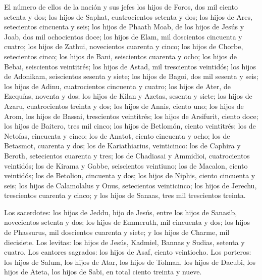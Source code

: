  El número de ellos de la nación y sus jefes los hijos de
Foros, dos mil ciento setenta y dos; los hijos de Saphat, cuatrocientos
setenta y dos;  los hijos de Ares, setecientos cincuenta
y seis;  los hijos de Phaath Moab, de los hijos de Jesús
y Joab, dos mil ochocientos doce;  los hijos de Elam, mil
doscientos cincuenta y cuatro; los hijos de Zathui, novecientos cuarenta
y cinco; los hijos de Chorbe, setecientos cinco; los hijos de Bani,
seiscientos cuarenta y ocho;  los hijos de Bebai,
seiscientos veintitrés; los hijos de Astad, mil trescientos veintidós;
 los hijos de Adonikam, seiscientos sesenta y siete; los
hijos de Bagoi, dos mil sesenta y seis; los hijos de Adinu,
cuatrocientos cincuenta y cuatro;  los hijos de Ater, de
Ezequías, noventa y dos; los hijos de Kilan y Azetas, sesenta y siete;
los hijos de Azaru, cuatrocientos treinta y dos;  los
hijos de Annis, ciento uno; los hijos de Arom, los hijos de Bassai,
trescientos veintitrés; los hijos de Arsifurit, ciento doce;
 los hijos de Baitero, tres mil cinco; los hijos de
Betlomón, ciento veintitrés;  los de Netofas, cincuenta y
cinco; los de Anatot, ciento cincuenta y ocho; los de Betasmot, cuarenta
y dos;  los de Kariathiarius, veinticinco: los de Caphira
y Beroth, setecientos cuarenta y tres;  los de Chadiasai
y Ammidioi, cuatrocientos veintidós; los de Kirama y Gabbe, seiscientos
veintiuno;  los de Macalon, ciento veintidós; los de
Betolion, cincuenta y dos; los hijos de Niphis, ciento cincuenta y seis;
 los hijos de Calamolalus y Onus, setecientos
veinticinco; los hijos de Jerechu, trescientos cuarenta y cinco;
 y los hijos de Sanaas, tres mil trescientos treinta.

 Los sacerdotes: los hijos de Jeddu, hijo de Jesús, entre
los hijos de Sanasib, novecientos setenta y dos; los hijos de Emmeruth,
mil cincuenta y dos;  los hijos de Phassurus, mil
doscientos cuarenta y siete; y los hijos de Charme, mil diecisiete.
 Los levitas: los hijos de Jesús, Kadmiel, Bannas y
Sudias, setenta y cuatro.  Los cantores sagrados: los
hijos de Asaf, ciento veintiocho.  Los porteros: los
hijos de Salum, los hijos de Atar, los hijos de Tolman, los hijos de
Dacubi, los hijos de Ateta, los hijos de Sabi, en total ciento treinta y
nueve.

